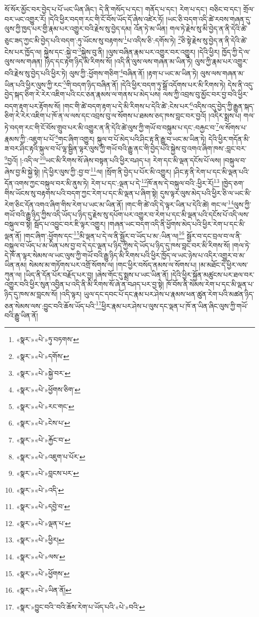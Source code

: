 སོ་སོར་མྱོང་བར་བྱེད་པ་པོ་ཡང་ཡིན་ཞིང་། དེ་ནི་གསོད་པ་དང་། གནོད་པ་དང་། རེག་པ་དང་། བཅིང་བ་དང་། གྲོལ་བར་ཡང་འགྱུར་རོ། །དེའི་ཕྱིར་བདག་རང་གི་ངོ་བོས་ཡོད་དོ་ཞེས་འཛེར་ཏོ། །ཡང་ཅི་བདག་འདི་ཚེ་རབས་གཞན་དུ་ལུས་ཀྱི་ཁྱད་པར་གྱི་རྣམ་པར་འགྱུར་བའི་རྗེས་སུ་བྱེད་དམ། འོན་ཏེ་མ་ཡིན། གལ་ཏེ་རྗེས་སུ་མི་བྱེད་ན་ནི་དེའི་ཚེ་ཅུང་ཟད་ཀྱང་མི་བྱེད་པའི་བདག་:ཏུ་ཡོངས་སུ་བརྟགས་\footnote{«སྣར་»«པེ་»ཏུ་བཏགས་}པ་འདིས་ཅི་:དགོས་ཏེ། \footnote{«སྣར་»«པེ་»དགོས་}ཅི་སྟེ་རྗེས་སུ་བྱེད་ན་ནི་དེའི་ཚེ་ངེས་པར་ཁྱོད་ལ། སྐྱེས་དང་:སྐྱེ་བ་\footnote{«སྣར་»«པེ་»སྐྱེ་བར་}སྐྱེས་བུ་ནི། །ལུས་བཞིན་རྣམ་པར་འགྱུར་བར་འགྱུར། །དེའི་ཕྱིར། ཁྱོད་ཀྱི་དེ་ལ་ལུས་ལས་གཞན། །ཉིད་དང་རྟག་ཉིད་མི་རིགས་སོ། །འདི་ནི་ལུས་ལས་གཞན་མ་ཡིན་ཏེ། ལུས་ཀྱི་རྣམ་པར་འགྱུར་བའི་རྗེས་སུ་བྱེད་པའི་ཕྱིར་ཏེ། ལུས་ཀྱི་:ཕྱོགས་གཅིག་\footnote{«སྣར་»«པེ་»ཕྱོགས་ཅིག་}བཞིན་ནོ། །རྟག་པ་ཡང་མ་ཡིན་ཏེ། ལུས་ལས་གཞན་མ་ཡིན་པའི་ཕྱིར་ལུས་ཀྱི་རང་\footnote{«སྣར་»«པེ་»རང་གང་}གི་བདག་ཉིད་བཞིན་ནོ། །དེའི་ཕྱིར་བདག་ཏུ་སྒྲོ་འདོགས་པར་མི་རིགས་ཏེ། དེས་ནི་འདུ་བྱེད་སྐད་ཅིག་རེ་རེར་འཇིག་པའི་ངང་ཅན་རྣམས་ལ་གནས་པ་མེད་པས། ལས་ཀྱི་འབྲས་བུ་མྱོང་བར་བྱ་བའི་ཕྱིར་བདག་རྟག་པར་རྟོགས་སོ། །གང་གི་ཚེ་བདག་རྟག་པ་དེ་མི་རིགས་པ་དེའི་ཚེ་:ངེས་པར་\footnote{«སྣར་»«པེ་»ངེས་པ་}འདིས་འདུ་བྱེད་ཀྱི་རྒྱུན་སྐད་ཅིག་རེ་རེར་འཇིག་པ་ཁོ་ན་ལ་ལས་དང་འབྲས་བུ་ལ་སོགས་པ་ཐམས་ཅད་ཁས་བླང་བར་བྱའོ། །འདིར་སྨྲས་པ། གལ་ཏེ་བདག་རང་གི་ངོ་བོས་གྲུབ་པར་མི་འགྱུར་ན་ནི་དེའི་ཚེ་ལུས་ཀྱི་གཡོ་བ་བསྐུམ་པ་དང་:བརྐྱང་བ་\footnote{«སྣར་»«པེ་»རྐྱོང་བ་}ལ་སོགས་པ་རྣམས་ཀྱི་:འཇུག་པ་པོ་\footnote{«སྣར་»«པེ་»འཇུག་པ་པོར་}གང་ཞིག་འགྱུར། སྐུལ་བ་པོ་མེད་པའི་ཤིང་རྟ་ནི་རྒྱུ་བ་ཡང་མ་ཡིན་ཏེ། དེའི་ཕྱིར་གདོན་མི་ཟ་བར་ཤིང་རྟའི་སྐུལ་བ་པོ་ལྷ་སྦྱིན་ལྟར་ལུས་ཀྱི་གཡོ་བའི་རྒྱུ་ནང་གི་བྱེད་པའི་སྐྱེས་བུ་འགའ་ཞིག་ཁས་:བླང་བར་\footnote{«སྣར་»«པེ་»བླངས་པར་}བྱའོ། །:འདི་ལ་\footnote{«སྣར་»«པེ་»འདི་}ཡང་མི་རིགས་སོ་ཞེས་བསྟན་པའི་ཕྱིར་བཤད་པ། རེག་དང་མི་ལྡན་དངོས་པོ་ལས། །བསྐུལ་བ་ཞེས་བྱ་མི་སྐྱེ་སྟེ། །དེ་ཕྱིར་ལུས་ཀྱི་:བྱ་བ་\footnote{«སྣར་»«པེ་»དབྱེ་བ་}ལ། །སྲོག་ནི་བྱེད་པ་པོར་མི་འགྱུར། །ཤིང་རྟ་ནི་རེག་པ་དང་མི་ལྡན་པའི་དོན་འགས་ཀྱང་བསྐུལ་བར་མི་ནུས་ཏེ། རེག་པ་དང་:ལྡན་པ་དེ་\footnote{«སྣར་»«པེ་»ལྡན་པ་}ཁོ་ནས་དེ་བསྐུལ་བའི་:ཕྱིར་རོ།\footnote{«སྣར་»«པེ་»ཕྱིར།} །ཁྱེད་ཅག་གིས་ཡོངས་སུ་བརྟགས་པའི་བདག་ཀྱང་རེག་པ་དང་མི་ལྡན་པ་ཞིག་སྟེ། དུས་ལྟར་ལུས་མེད་པའི་ཕྱིར་ཅི་ལ་ཡང་མི་རེག་ཅིང་དོན་འགའ་ཞིག་གིས་རེག་པ་ཡང་མ་ཡིན་ནོ། །གང་གི་ཚེ་འདི་དེ་ལྟར་ཡིན་པ་དེའི་ཚེ། གང་ལ་\footnote{«སྣར་»«པེ་»ལས་}ལུས་ཀྱི་གཡོ་བའི་རྒྱུ་ཉིད་ཀྱིས་འདི་ཡོད་པ་ཉིད་དུ་རྗེས་སུ་དཔོག་པར་འགྱུར་བ་རེག་པ་དང་མི་ལྡན་པའི་དངོས་པོ་འདི་ལས་བསྐུལ་བ་སྟེ། སྦོད་པ་འབྱུང་བར་ཇི་ལྟར་འགྱུར། །གཞན་ཡང་བདག་འདི་ནི་ཕྱོགས་མེད་པའི་ཕྱིར་རེག་པ་དང་མི་ལྡན་ནོ། །གང་ཞིག་:ཕྱོགས་དང་\footnote{«སྣར་»«པེ་»ཕྱོགས་}མི་ལྡན་པ་དེ་ལ་ནི་སྦྱོར་བ་ཡོད་པ་མ་:ཡིན་ལ།\footnote{«སྣར་»«པེ་»ཡིན་ནོ།} སྦྱོར་བ་དང་བྲལ་བ་ལ་ནི་བསྐུལ་བ་ཡོད་པ་མ་ཡིན་པས་བྱ་བ་དེ་དང་ལྡན་པ་ཉིད་ཀྱིས་དེ་ཡོད་པ་ཉིད་དུ་ཁས་བླང་བར་མི་རིགས་སོ། །གལ་ཏེ་དེ་ཁོ་ན་ལྟར་སེམས་ལ་ཡང་ལུས་ཀྱི་གཡོ་བའི་རྒྱུ་ཉིད་མི་རིགས་པའི་ཕྱིར་ཁྱོད་ལ་ཡང་ཉེས་པ་འདིར་འགྱུར་བ་མ་ཡིན་ནམ། སེམས་མ་གཏོགས་པར་འགྲོ་སོགས་ལ། །གང་ཕྱིར་བསོད་ནམས་ལ་སོགས་པ། །མ་མཐོང་དེ་ཕྱིར་ལས་ཀུན་ལ། །ཡིད་ནི་དོན་པོར་བརྗོད་པར་བྱ། །ཞེས་གོང་དུ་སྨྲས་པ་ཡང་ཡིན་ནོ། །དེའི་ཕྱིར་སྐྱོན་མཚུངས་པར་ཐལ་བར་འགྱུར་བའི་ཕྱིར་སུན་འབྱིན་པ་འདི་ནི་མི་རིགས་སོ་ཞེ་ན་བཤད་པར་བྱ་སྟེ། ཁོ་བོས་ནི་སེམས་རེག་པ་དང་མི་ལྡན་པ་ཉིད་དུ་ཁས་མ་བླངས་སོ། །འདི་ལྟར། ཡུལ་དང་དབང་པོ་དང་རྣམ་པར་ཤེས་པ་རྣམས་ཕན་ཚུན་རེག་པའི་མཚན་ཉིད་ཅན་སེམས་ལས་:བྱུང་བའི་ཆོས་ཡོད་པའི་\footnote{«སྣར་»བྱུང་བའི་་བའི་ཆོས་རེག་པ་ཡོད་པའི་«པེ་»བའི་}ཕྱིར་རྣམ་པར་ཤེས་པ་ལུས་དང་ལྡན་པ་ཁོ་ན་ཡིན་ཞིང་ལུས་ཀྱི་གཡོ་བའི་རྒྱུ་ཡིན་ནོ། 